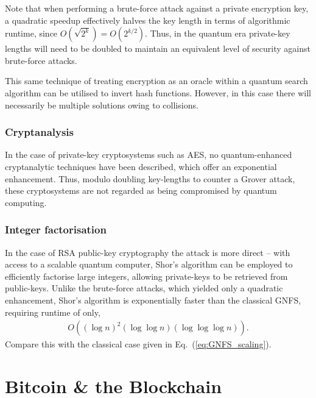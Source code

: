 Note that when performing a brute-force attack against a private encryption key, a quadratic speedup effectively halves the key length in terms of algorithmic runtime, since \mbox{$O(\sqrt{2^k}) = O(2^{k/2})$}. Thus, in the quantum era private-key lengths will need to be doubled to maintain an equivalent level of security against brute-force attacks.

This same technique of treating encryption as an oracle within a quantum search algorithm can be utilised to invert hash functions. However, in this case there will necessarily be multiple solutions owing to collisions.

%
%

\subsubsection{Cryptanalysis}

In the case of private-key cryptosystems such as AES, no quantum-enhanced cryptanalytic techniques have been described, which offer an exponential enhancement. Thus, modulo doubling key-lengths to counter a Grover attack, these cryptosystems are not regarded as being compromised by quantum computing.

%
%

\subsubsection{Integer factorisation}

In the case of RSA public-key cryptography the attack is more direct -- with access to a scalable quantum computer, Shor's algorithm can be employed to efficiently factorise large integers, allowing private-keys to be retrieved from public-keys. Unlike the brute-force attacks, which yielded only a quadratic enhancement, Shor's algorithm is exponentially faster than the classical GNFS, requiring runtime of only,
\begin{align}
	O((\log n)^2(\log\log n)(\log\log\log n)).
\end{align}
Compare this with the classical case given in Eq.~(\ref{eq:GNFS_scaling}).

%
%

\section{Bitcoin \& the Blockchain}\label{sec:bitcoin_blockchain}

